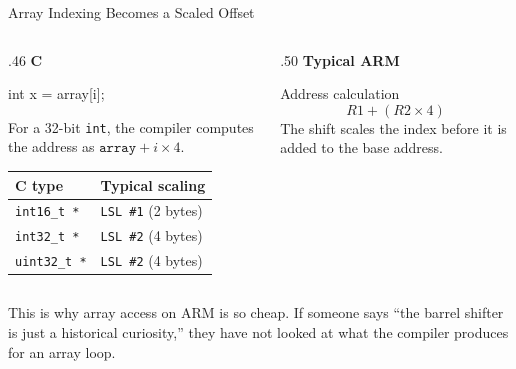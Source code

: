 \documentclass[9pt,aspectratio=169,xcolor=table]{beamer}
\begin{document}
\begin{frame}[fragile]{Array Indexing Becomes a Scaled Offset}
	\begin{columns}[T]
		\begin{column}{.46\textwidth}
			\textbf{C}

			\begin{cc}
	int x = array[i];
\end{cc}

			\vspace{2mm}
			{\small
				For a 32-bit \texttt{int}, the compiler computes the
				address as $\texttt{array} + i \times 4$.
			}

			\vspace{5mm}
		{\small
	\begin{tabular}{@{}l l@{}}
		\toprule
		\textbf{C type} & \textbf{Typical scaling} \\
		\midrule
		\texttt{int16\_t *} & \texttt{LSL \#1} \quad (2 bytes) \\
		\texttt{int32\_t *} & \texttt{LSL \#2} \quad (4 bytes) \\
		\texttt{uint32\_t *} & \texttt{LSL \#2} \quad (4 bytes) \\
		\bottomrule
\end{tabular}}
		\end{column}

		\begin{column}{.50\textwidth}
			\textbf{Typical ARM}

			\vspace{2mm}
			\begin{block}{Address calculation}
				\[
				R1 + (R2 \times 4)
				\]
				The shift scales the index before it is added to the
				base address.
			\end{block}
		\end{column}
	\end{columns}

	\vspace{3mm}

	\begin{center}
	\end{center}
	\vspace{2mm}

This is why array access on ARM is so cheap.
{\small If someone says ``the barrel shifter is just a historical    curiosity,'' they have not looked at what the compiler produces for    an array loop.}



\end{frame}
\end{document}
